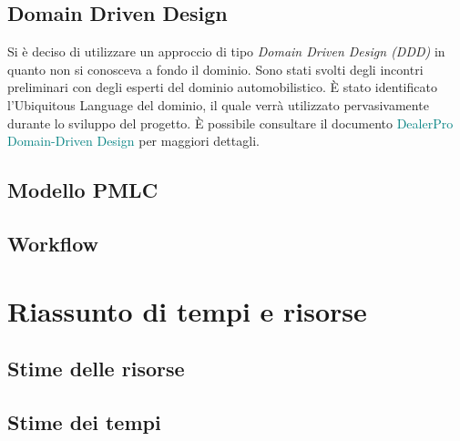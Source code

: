 \documentclass{article}
\begin{document}
  \subsection{Domain Driven Design}

  Si è deciso di utilizzare un approccio di tipo \emph{Domain Driven Design (DDD)} in quanto non si conosceva 
  a fondo il dominio. Sono stati svolti degli incontri preliminari con degli esperti del 
  dominio automobilistico. È stato identificato l’Ubiquitous Language del dominio, il quale verrà utilizzato 
  pervasivamente durante lo sviluppo del progetto. 
  È possibile consultare il documento \textcolor{teal}{DealerPro Domain-Driven Design} per maggiori dettagli.

  \subsection{Modello PMLC}
  \subsection{Workflow}

  \newpage
  \section{Riassunto di tempi e risorse}

  \subsection{Stime delle risorse}

  \subsection{Stime dei tempi}
\end{document}
